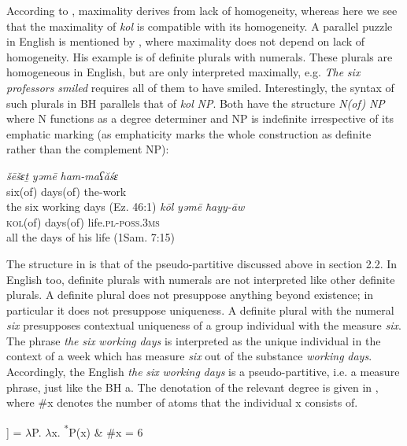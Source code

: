 \documentclass[output=paper]{langsci/langscibook}
\begin{document}
According to \citet{Križ2016}, maximality derives from lack of homogeneity, \linebreak whereas here we see that the maximality of \textit{kol} is compatible with its homogeneity. A parallel puzzle in English is mentioned by \citet[515]{Križ2016}, where maximality does not depend on lack of homogeneity. His example is of definite plurals with numerals. These plurals are homogeneous in English, but are only interpreted maximally, e.g. \textit{The} \textit{six} \textit{professors} \textit{smiled} requires all of them to have smiled. Interestingly, the syntax of such plurals in BH parallels that of \textit{kol} \textit{NP}. Both have the structure \textit{N(of)} \textit{NP} where N functions as a degree determiner and NP is indefinite irrespective of its emphatic marking (as emphaticity marks the whole construction as definite rather than the complement NP):

\ea%
    \label{ex:doron:31}
    \ea
    \gll \textit{šēšɛṯ}      \textit{yəmē}      \textit{ham-maʕăśɛ}       \\
         six(of)  days(of)  the-work              \\
    \glt the six working days  (Ez. 46:1)
    \ex
    \gll \textit{kōl}          \textit{yəmē}        \textit{ħayy-āw} \\
         \textsc{kol(}of)  days(of)   life.\textsc{pl-poss.3ms}\\
    \glt all the days of his life  (1Sam. 7:15)
    \z
\z

The structure in  is that of the pseudo-partitive discussed above in section 2.2. In English too, definite plurals with numerals are not interpreted like other definite plurals. A definite plural does not presuppose anything beyond existence; in particular it does not presuppose uniqueness. A definite plural with the numeral \textit{six} presupposes contextual uniqueness of a group individual with the measure \textit{six}. The phrase \textit{the} \textit{six} \textit{working} \textit{days} is interpreted as the unique individual in the context of a week which has measure \textit{six} out of the substance \textit{working} \textit{days}. Accordingly, the English \textit{the} \textit{six} \textit{working} \textit{days} is a pseudo-partitive, i.e. a measure phrase, just like the BH a. The denotation of the relevant degree is given in , where \#x denotes the number of atoms that the individual x consists of.

\ea%
    \label{ex:doron:32}\relax
     [[\textit{šēšɛṯ}]] = ${\lambda}$P. ${\lambda}$x. \textsuperscript{*}P(x) \& \#x = 6
\z
\end{document}
